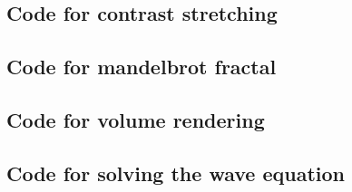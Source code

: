\documentclass[a4paper]{article}
\begin{document}
\subsection{Code for contrast stretching}


\subsection{Code for mandelbrot fractal}



\subsection{Code for volume rendering}


\subsection{Code for solving the wave equation}

\end{document}
